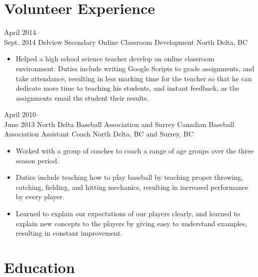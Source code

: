 \documentclass[]{friggeri-cv} %
\begin{document}
\section{Volunteer Experience}

\begin{entrylist}

\entry
{April 2014--\\Sept. 2014}
{Delview Secondary {\normalfont Online Classroom Development}}
{North Delta, BC}
{
\begin{itemize}
\item Helped a high school science teacher develop an online classroom
environment. Duties include writing Google
Scripts to grade assignments, and take attendance, resulting in less marking
time for the teacher so that he can
dedicate more time to teaching his students, and instant feedback, as the
assignments email the student their
results.
\end{itemize}
}

\entry
{April 2010--\\June 2013}
{North Delta Baseball Association and Surrey Canadian Baseball Association {\normalfont Assistant Coach}}
{North Delta, BC and Surrey, BC}
{
\begin{itemize}
\item Worked with a group of coaches to coach a range of age groups over the three
season period.
\item Duties include teaching how to play baseball by teaching proper throwing,
catching, fielding, and hitting
mechanics, resulting in increased performance by every player.
\item Learned to explain our expectations of our players clearly, and learned to
explain new concepts to the players
by giving easy to understand examples, resulting in constant improvement.
\end{itemize}
}
\end{entrylist}

\newpage


\section{Education}
\end{document}
